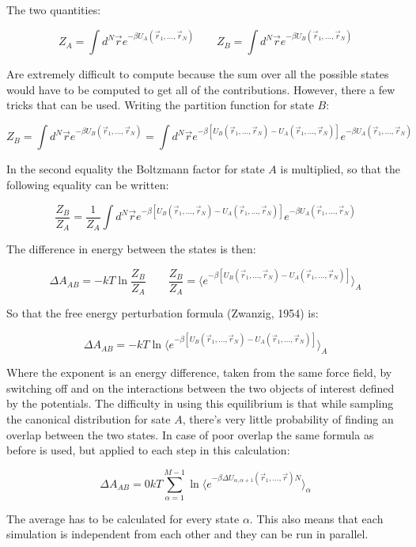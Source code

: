 The two quantities:

$$Z_A = \int d^N\vec{r}e^{-\beta U_A(\vec{r}_1, \dots, \vec{r}_N)}\qquad Z_B = \int d^N\vec{r}e^{-\beta U_B(\vec{r}_1, \dots, \vec{r}_N)}$$

Are extremely difficult to compute because the sum over all the possible states would have to be computed to get all of the contributions.
However, there a few tricks that can be used.
Writing the partition function for state $B$:

$$Z_B = \int d^N\vec{r}e^{-\beta U_B(\vec{r}_1, \dots, \vec{r}_N)} = \int d^N\vec{r}e^{-\beta[U_B(\vec{r}_1, \dots, \vec{r}_N)-U_{A}(\vec{r}_1, \dots, \vec{r}_N)]}e^{-\beta U_A(\vec{r}_1, \dots, \vec{r}_N)}$$

In the second equality the Boltzmann factor for state $A$ is multiplied, so that the following equality can be written:

$$\frac{Z_B}{Z_A} = \frac{1}{Z_A}\int d^N\vec{r}e^{-\beta[U_B(\vec{r}_1, \dots, \vec{r}_N)-U_{A}(\vec{r}_1, \dots, \vec{r}_N)]}e^{-\beta U_A(\vec{r}_1, \dots, \vec{r}_N)}$$

The difference in energy between the states is then:

$$\Delta A_{AB} = -kT\ln\frac{Z_B}{Z_A}\qquad\frac{Z_B}{Z_A} = \biggl\langle e^{-\beta[U_B(\vec{r}_1, \dots, \vec{r}_N)-U_A(\vec{r}_1, \dots, \vec{r}_N)]}\biggr\rangle_A$$

So that the free energy perturbation formula (Zwanzig, 1954) is:

$$\Delta A_{AB} = -kT\ln\biggl\langle e^{-\beta[U_B(\vec{r}_1, \dots, \vec{r}_N)-U_A(\vec{r}_1, \dots, \vec{r}_N)]}\biggr\rangle_A$$

Where the exponent is an energy difference, taken from the same force field, by switching off and on the interactions between the two objects of interest defined by the potentials.
The difficulty in using this equilibrium is that while sampling the canonical distribution for sate $A$, there's very little probability of finding an overlap between the two states.
In case of poor overlap the same formula as before is used, but applied to each step in this calculation:

$$\Delta A_{AB}=0kT\sum\limits_{\alpha=1}^{M-1}\ln\bigl\langle e^{-\beta\Delta U_{\alpha, \alpha+1}(\vec{r}_1, \dots,\vec{r})N}\bigr\rangle_\alpha$$

The average has to be calculated for every state $\alpha$.
This also means that each simulation is independent from each other and they can be run in parallel.

